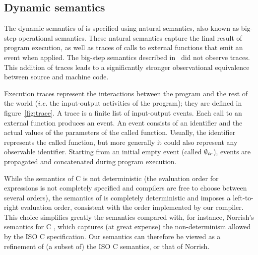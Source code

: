\documentclass[namedreferences]{kluwer}
\begin{document}
\begin{article}
\subsection{Dynamic semantics}

The dynamic semantics of \Clight{} is specified using natural semantics, 
also known as big-step operational semantics. 
 These natural semantics capture the final result of program execution, as 
well as traces of calls to external functions that emit an event when applied.
The big-step semantics described in~\cite{blazy06:fm} did not observe traces.
This addition of traces leads to a significantly
stronger observational equivalence between source and machine code.

Execution traces represent the interactions between the program and
the rest of the world (\textit{i.e.} the input-output activities of 
the program); they are defined in figure~\ref{fig:trace}.
A trace is a finite list of input-output events.
Each call to an external function produces an event. 
An event consists of an identifier and the actual values of the parameters of
the called function. Usually, the identifier represents the called function,
but more generally it could also represent any observable identifier.
Starting from an initial empty event (called $\E0$), events are propagated and 
concatenated during program execution.



While the semantics of
C is not deterministic (the evaluation order for expressions is not
completely specified and compilers are free to choose between several
orders), the semantics of \Clight{} is completely deterministic and
imposes a left-to-right evaluation order, consistent with the order
implemented by our compiler.  This choice simplifies greatly the
semantics compared with, for instance, Norrish's semantics for C
\cite{Norrish:phd}, which captures (at great expense) the
non-determinism allowed by the ISO C specification.  Our semantics can
therefore be viewed as a refinement of (a subset of) the ISO C
semantics, or that of Norrish.


\end{article}
\end{document}
